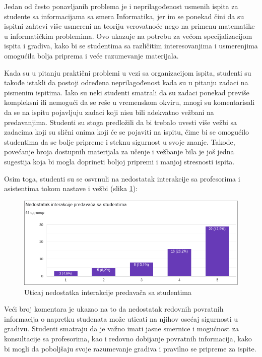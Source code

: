\documentclass[a4paper]{article}
\begin{document}
Jedan od često ponavljanih problema je i neprilagođenost usmenih ispita za studente sa informacijama sa smera Informatika, jer im se ponekad čini da su ispitni zahtevi više usmereni na teoriju verovatnoće nego na primenu matematike u informatičkim problemima. Ovo ukazuje na potrebu za većom specijalizacijom ispita i gradiva, kako bi se studentima sa različitim interesovanjima i usmerenjima omogućila bolja priprema i veće razumevanje materijala.

Kada su u pitanju praktični problemi u vezi sa organizacijom ispita, studenti su takođe istakli da postoji određena neprilagođenost kada su u pitanju zadaci na pismenim ispitima. Iako su neki studenti smatrali da su zadaci ponekad previše kompleksni ili nemogući da se reše u vremenskom okviru, mnogi su komentarisali da se na ispitu pojavljuju zadaci koji nisu bili adekvatno vežbani na predavanjima. Studenti su stoga predložili da bi trebalo uvesti više vežbi sa zadacima koji su slični onima koji će se pojaviti na ispitu, čime bi se omogućilo studentima da se bolje pripreme i steknu sigurnost u svoje znanje. Takođe, povećanje broja dostupnih materijala za učenje i vežbanje bila je još jedna sugestija koja bi mogla doprineti boljoj pripremi i manjoj stresnosti ispita.

Osim toga, studenti su se osvrnuli na nedostatak interakcije sa profesorima i asistentima tokom nastave i vežbi (slika \ref{fig:nedostatak_interakcije}):
\begin{figure}[h!]
\begin{center}
\includegraphics[scale=0.4]{data_rezultati/nedostatak_interakcije.png}
\end{center}
\caption{Uticaj nedostatka interakcije predavača sa studentima}
\label{fig:nedostatak_interakcije}
\end{figure}

Veći broj komentara je ukazao na to da nedostatak redovnih povratnih informacija o napretku studenata može uticati na njihov osećaj sigurnosti u gradivu. Studenti smatraju da je važno imati jasne smernice i mogućnost za konsultacije sa profesorima, kao i redovno dobijanje povratnih informacija, kako bi mogli da poboljšaju svoje razumevanje gradiva i pravilno se pripreme za ispite.
\end{document}
